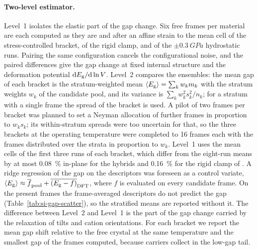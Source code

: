 \paragraph{Two-level estimator.}
Level~1 isolates the elastic part of the gap change. Six free frames per
material are each computed as they are and after an affine strain to the mean
cell of the stress-controlled bracket, of the rigid clamp, and of the
$\pm\SI{0.3}{GPa}$ hydrostatic runs. Pairing the same configuration cancels
the configurational noise, and the paired differences give the gap change at
fixed internal structure and the deformation potential $\mathrm{d}E_\mathrm{g}/\mathrm{d}\ln V$.
Level~2 compares the ensembles: the mean gap of each bracket is the
stratum-weighted mean $\langle E_\mathrm{g}\rangle = \sum_k w_k m_k$ with the stratum
weights $w_k$ of the candidate pool, and its variance is $\sum_k w_k^2
s_k^2/n_k$; for a stratum with a single frame the spread of the bracket is used.
A pilot of two frames per bracket was planned to set a Neyman
allocation\cite{Neyman1934} of further frames in proportion to $w_k s_k$; its
within-stratum spreads were too uncertain for that, so the three brackets at the
operating temperature were completed to 16 frames each with the frames
distributed over the strata in proportion to $w_k$. Level~1 uses the mean cells
of the first three runs of each bracket, which differ from the eight-run means by
at most \SI{0.08}{\percent} in-plane for the hybrids and \SI{0.16}{\percent}
for the rigid clamp of \CsSnI{}. A ridge regression of the gap on the descriptors was foreseen as a
control variate, $\langle E_\mathrm{g}\rangle \approx \overline{f}_\mathrm{pool} +
\overline{(E_\mathrm{g} - f)}_\mathrm{DFT}$, where $f$ is evaluated on every candidate
frame. On the present frames the frame-averaged descriptors do not predict the
gap (Table~\ref{tab:si-gap-scatter}), so the stratified means are reported
without it. The difference between Level~2 and Level~1 is the part of the gap
change carried by the relaxation of tilts and cation orientations. For each
bracket we report the mean gap shift relative to the free crystal at the same
temperature and the smallest gap of the frames computed, because carriers
collect in the low-gap tail.

